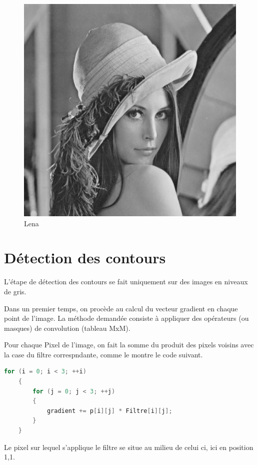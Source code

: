 \documentclass[11pt]{article}
\begin{document}
	\begin{figure}[H]
		\centering
		\includegraphics[scale=0.20]{Image/lena.png}
		\caption{Lena}
		\label{fig:Lena}
	\end{figure}

\section{Détection des contours}
	
	L'étape de détection des contours se fait uniquement sur des images en niveaux de gris.

	Dans un premier temps, on procède au calcul du vecteur gradient en chaque point de l'image.
	La méthode demandée consiste à appliquer des opérateurs (ou masques) de convolution (tableau MxM).

	Pour chaque Pixel de l'image, on fait la somme du produit des pixels voisins avec la case du filtre correspndante, comme le montre le code suivant.
	\begin{lstlisting}[caption={Utilisation d'un masque de convolution 3x3},language=C++,label=utilisationMasque]
	for (i = 0; i < 3; ++i)
	{
		for (j = 0; j < 3; ++j)
		{ 
			gradient += p[i][j] * Filtre[i][j];	
		}
	}
	\end{lstlisting}

	Le pixel sur lequel s'applique le filtre se situe au milieu de celui ci, ici en position 1,1.
\end{document}
